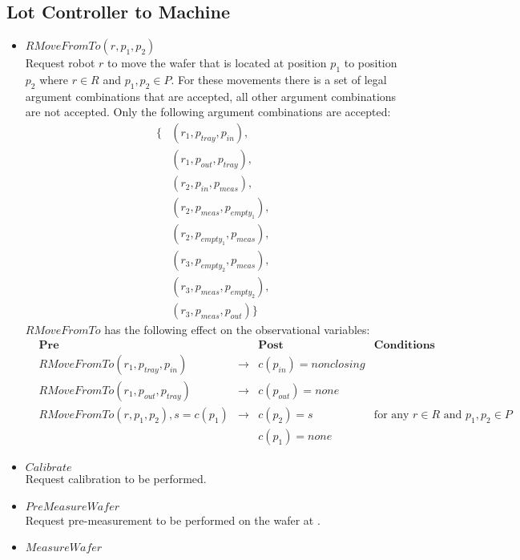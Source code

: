 \subsection{Lot Controller to Machine}
\begin{itemize}
\item $\mathit{RMoveFromTo}(r, p_1, p_2)$
\\Request robot $r$ to move the wafer that is located at position $p_1$ to position $p_2$ where $r \in R$ and $p_1, p_2 \in P$.
For these movements there is a set of legal argument combinations that are accepted, all other argument combinations are not accepted.
Only the following argument combinations are accepted:
\begin{align*}
\{ & (r_1, p_\mathit{tray}, p_\mathit{in}),&\\
& (r_1, p_\mathit{out}, p_\mathit{tray}),&\\
&(r_2, p_\mathit{in}, p_\mathit{meas}),&\\
&(r_2, p_\mathit{meas}, p_{\mathit{empty}_1}),&\\
&(r_2, p_{\mathit{empty}_1}, p_\mathit{meas}),&\\
&(r_3, p_{\mathit{empty}_2}, p_\mathit{meas}),&\\
&(r_3, p_\mathit{meas}, p_{\mathit{empty}_2}),&\\
&(r_3, p_\mathit{meas}, p_\mathit{out})\}
\end{align*}
$\mathit{RMoveFromTo}$ has the following effect on the observational variables: 
\begin{align*}
&\textbf{Pre}&&\textbf{Post}&\textbf{Conditions}&\\
&\mathit{RMoveFromTo}(r_1, p_\mathit{tray}, p_\mathit{in})&\rightarrow&c(p_\mathit{in}) = \mathit{nonclosing}&&\\
&\mathit{RMoveFromTo}(r_1, p_\mathit{out}, p_\mathit{tray})&\rightarrow&c(p_\mathit{out}) = \mathit{none}&&\\
&\mathit{RMoveFromTo}(r, p_1, p_2), s = c(p_1)&\rightarrow&c(p_2) = s&\text{for any }r \in R\text{ and }p_1,p_2 \in P&\\
&&&c(p_1)=none&&
\end{align*}
\item $\mathit{Calibrate}$
\\Request calibration to be performed.
\item $\mathit{PreMeasureWafer}$
\\Request pre-measurement to be performed on the wafer at \chuckIn.
\item $\mathit{MeasureWafer}$

\end{itemize}
